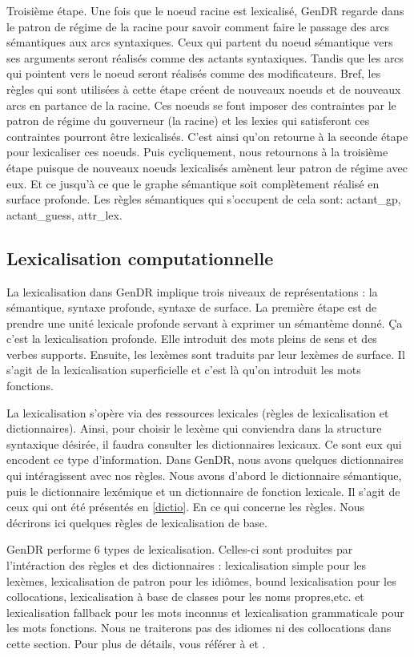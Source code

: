 Troisième étape. Une fois que le noeud racine est lexicalisé, GenDR regarde dans le patron de régime de la racine pour savoir comment faire le passage des arcs sémantiques aux arcs syntaxiques. Ceux qui partent du noeud sémantique vers ses arguments seront réalisés comme des actants syntaxiques. Tandis que les arcs qui pointent vers le noeud seront réalisés comme des modificateurs. Bref, les règles qui sont utilisées à cette étape créent de nouveaux noeuds et de nouveaux arcs en partance de la racine. Ces noeuds se font imposer des contraintes par le patron de régime du gouverneur (la racine) et les lexies qui satisferont ces contraintes pourront être lexicalisés. C'est ainsi qu'on retourne à la seconde étape pour lexicaliser ces noeuds. Puis cycliquement, nous retournons à la troisième étape puisque de nouveaux noeuds lexicalisés amènent leur patron de régime avec eux. Et ce jusqu'à ce que le graphe sémantique soit complètement réalisé en surface profonde. Les règles sémantiques qui s'occupent de cela sont: actant\_gp, actant\_guess, attr\_lex. 

\subsection{Lexicalisation computationnelle}
La lexicalisation dans GenDR implique trois niveaux de représentations : la sémantique, syntaxe profonde, syntaxe de surface. La première étape est de prendre une unité lexicale profonde servant à exprimer un sémantème donné. Ça c'est la lexicalisation profonde. Elle introduit des mots pleins de sens et des verbes supports. Ensuite, les lexèmes sont traduits par leur lexèmes de surface. Il s'agit de la lexicalisation superficielle et c'est là qu'on introduit les mots fonctions.

La lexicalisation s'opère via des ressources lexicales (règles de lexicalisation et dictionnaires). Ainsi, pour choisir le lexème qui conviendra dans la structure syntaxique désirée, il faudra consulter les dictionnaires lexicaux. Ce sont eux qui encodent ce type d'information. Dans GenDR, nous avons quelques dictionnaires qui intéragissent avec nos règles. Nous avons d'abord le dictionnaire sémantique, puis le dictionnaire lexémique et un dictionnaire de fonction lexicale. Il s'agit de ceux qui ont été présentés en \ref{dictio}. En ce qui concerne les règles. Nous décrirons ici quelques règles de lexicalisation de base.

GenDR performe 6 types de lexicalisation. Celles-ci sont produites par l'intéraction des règles et des dictionnaires : lexicalisation simple pour les lexèmes, lexicalisation de patron pour les idiômes, bound lexicalisation pour les collocations, lexicalisation à base de classes pour les noms propres,etc. et lexicalisation fallback pour les mots inconnus et lexicalisation grammaticale pour les mots fonctions.  Nous ne traiterons pas des idiomes ni des collocations dans cette section. Pour plus de détails, vous référer à \citep{LambreyImplementationcollocationspour2017} et \citep{lambrey15}.

